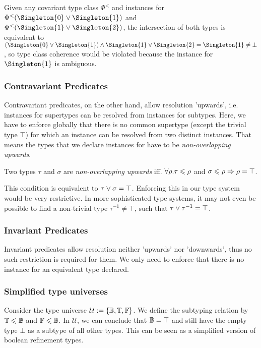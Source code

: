 Given any covariant type class $\Phi^<$ and instances for $\Phi^<(\Singleton{0} \join \Singleton{1})$ and $\Phi^<(\Singleton{1} \join \Singleton{2})$,
the intersection of both types is equivalent to $(\Singleton{0} \join \Singleton{1}) \meet \Singleton{1} \join \Singleton{2} = \Singleton{1} \neq \bot$, so type class coherence would be violated because the instance for $\Singleton{1}$ is ambiguous.

\subsubsection{Contravariant Predicates}

Contravariant predicates, on the other hand, allow resolution 'upwards', i.e. instances for supertypes can be resolved from instances for subtypes.
Here, we have to enforce globally that there is no common supertype (except the trivial type $\top$) for which an instance can be resolved from two distinct instances.
That means the types that we declare instances for have to be \emph{non-overlapping upwards}.

\begin{definition}
  Two types $\tau$ and $\sigma$ are \emph{non-overlapping upwards} iff. $\forall\rho. \tau \leqslant \rho$ and $\sigma \leqslant \rho \Rightarrow \rho = \top$.
\end{definition}

This condition is equivalent to $\tau \vee \sigma = \top$.
Enforcing this in our type system would be very restrictive.
In more sophisticated type systems, it may not even be possible to find a non-trivial type $\tau^{-1} \neq \top$, such that $\tau \vee \tau^{-1} = \top$.


\subsubsection{Invariant Predicates}

Invariant predicates allow resolution neither 'upwards' nor 'downwards', thus no such restriction is required for them.
We only need to enforce that there is no instance for an equivalent type declared.



\subsubsection{Simplified type universes}

Consider the type universe $\mathcal{U} := \{ \mathbb{B}, \mathbb{T}, \mathbb{F} \}$.
We define the subtyping relation by $\mathbb{T} \leqslant \mathbb{B}$ and $\mathbb{F} \leqslant \mathbb{B}$.
In $\mathcal{U}$, we can conclude that $\mathbb{B} = \top$ and still have the empty type $\bot$ as a subtype of all other types.
This can be seen as a simplified version of boolean refinement types. \cite{springer}

